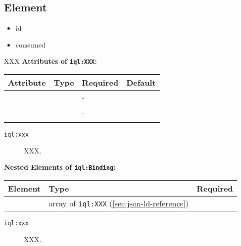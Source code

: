 \documentclass[11pt]{article}
\newcommand{\iqlns}{iql:}
\newcommand{\iqlType}[1]{\texttt{\iqlns#1}}
\newcommand{\attributes}[1]{\noindent\textbf{Attributes of \iqlType{#1}:}\newline\medskip}
\newcommand{\elements}[1]{\noindent\textbf{Nested Elements of \iqlType{#1}:}\newline\medskip}
\newcommand{\desc}[1]{\noindent#1\newline\medskip}
\begin{document}
\subsection{Element}
\label{sec:json-ld-element}
\begin{itemize}
\item id
\item consumed
\end{itemize}
\desc{XXX}
\attributes{XXX}
\begin{tabular}{|p{}|p{}|p{}|p{}|}
	\hline
	\textbf{Attribute} & \textbf{Type} & \textbf{Required} & \textbf{Default} \\ 
	\hline
	\hline
	&  & - &  \\ 
	\hline 
	&  & - &  \\ 
	\hline 
	&  &  & \\ 
	\hline 
\end{tabular}
\begin{description}
	\item[\iqlType{xxx}] XXX.
\end{description}
\elements{Binding}
\begin{tabular}{|p{}|p{}|p{}|}
	\hline
	\textbf{Element} & \textbf{Type} & \textbf{Required} \\ 
	\hline
	\hline 
	& array of \iqlType{XXX} (\ref{sec:json-ld-reference}) &  \\ 
	\hline 
\end{tabular}
\begin{description}
	\item[\iqlType{xxx}] XXX.
\end{description}

\end{document}
